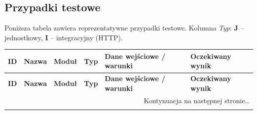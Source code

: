 \subsection{Przypadki testowe}

Poniższa tabela zawiera reprezentatywne przypadki testowe. Kolumna \emph{Typ}: \textbf{J} -- jednostkowy, \textbf{I} -- integracyjny (HTTP).

\begingroup
\scriptsize
\setlength{\tabcolsep}{2pt}
\begin{longtable}{p{1cm} >{\raggedright\arraybackslash}p{3.2cm} >{\raggedright\arraybackslash}p{1.6cm} p{0.6cm} >{\raggedright\arraybackslash}p{4.3cm} >{\raggedright\arraybackslash}p{4.3cm}}
\toprule
\textbf{ID} & \textbf{Nazwa} & \textbf{Moduł} & \textbf{Typ} & \textbf{Dane wejściowe / warunki} & \textbf{Oczekiwany wynik} \\
\midrule
\endfirsthead
\toprule
\textbf{ID} & \textbf{Nazwa} & \textbf{Moduł} & \textbf{Typ} & \textbf{Dane wejściowe / warunki} & \textbf{Oczekiwany wynik} \\
\midrule
\endhead
\midrule
\multicolumn{6}{r}{\footnotesize Kontynuacja na następnej stronie\ldots} \\
\endfoot
\bottomrule
\endlastfoot


\end{longtable}
